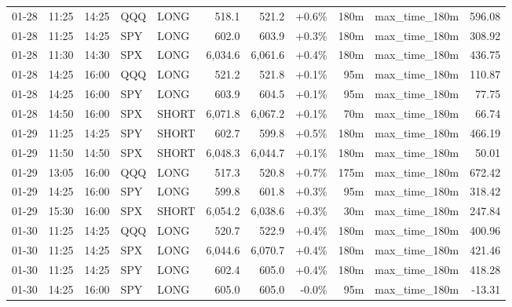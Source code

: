 \documentclass[11pt,a4paper,twoside]{article}
\begin{document}
\begin{center}
\begin{longtable}{>{\color{txtmain}}l l l l l r r r r >{\color{txtmain}}l r}
01-28 & 11:25 & 14:25 & QQQ & LONG & 518.1 & 521.2 & \textcolor{wingreen}{+0.6\%} & 180m & max\_time\_180m & \textcolor{wingreen}{596.08} \\
01-28 & 11:25 & 14:25 & SPY & LONG & 602.0 & 603.9 & \textcolor{wingreen}{+0.3\%} & 180m & max\_time\_180m & \textcolor{wingreen}{308.92} \\
01-28 & 11:30 & 14:30 & SPX & LONG & 6,034.6 & 6,061.6 & \textcolor{wingreen}{+0.4\%} & 180m & max\_time\_180m & \textcolor{wingreen}{436.75} \\
01-28 & 14:25 & 16:00 & QQQ & LONG & 521.2 & 521.8 & \textcolor{wingreen}{+0.1\%} & 95m & max\_time\_180m & \textcolor{wingreen}{110.87} \\
01-28 & 14:25 & 16:00 & SPY & LONG & 603.9 & 604.5 & \textcolor{wingreen}{+0.1\%} & 95m & max\_time\_180m & \textcolor{wingreen}{77.75} \\
01-28 & 14:50 & 16:00 & SPX & SHORT & 6,071.8 & 6,067.2 & \textcolor{wingreen}{+0.1\%} & 70m & max\_time\_180m & \textcolor{wingreen}{66.74} \\
01-29 & 11:25 & 14:25 & SPY & SHORT & 602.7 & 599.8 & \textcolor{wingreen}{+0.5\%} & 180m & max\_time\_180m & \textcolor{wingreen}{466.19} \\
01-29 & 11:50 & 14:50 & SPX & SHORT & 6,048.3 & 6,044.7 & \textcolor{wingreen}{+0.1\%} & 180m & max\_time\_180m & \textcolor{wingreen}{50.01} \\
01-29 & 13:05 & 16:00 & QQQ & LONG & 517.3 & 520.8 & \textcolor{wingreen}{+0.7\%} & 175m & max\_time\_180m & \textcolor{wingreen}{672.42} \\
01-29 & 14:25 & 16:00 & SPY & LONG & 599.8 & 601.8 & \textcolor{wingreen}{+0.3\%} & 95m & max\_time\_180m & \textcolor{wingreen}{318.42} \\
01-29 & 15:30 & 16:00 & SPX & SHORT & 6,054.2 & 6,038.6 & \textcolor{wingreen}{+0.3\%} & 30m & max\_time\_180m & \textcolor{wingreen}{247.84} \\
01-30 & 11:25 & 14:25 & QQQ & LONG & 520.7 & 522.9 & \textcolor{wingreen}{+0.4\%} & 180m & max\_time\_180m & \textcolor{wingreen}{400.96} \\
01-30 & 11:25 & 14:25 & SPX & LONG & 6,044.6 & 6,070.7 & \textcolor{wingreen}{+0.4\%} & 180m & max\_time\_180m & \textcolor{wingreen}{421.46} \\
01-30 & 11:25 & 14:25 & SPY & LONG & 602.4 & 605.0 & \textcolor{wingreen}{+0.4\%} & 180m & max\_time\_180m & \textcolor{wingreen}{418.28} \\
01-30 & 14:25 & 16:00 & SPY & LONG & 605.0 & 605.0 & \textcolor{lossred}{-0.0\%} & 95m & max\_time\_180m & \textcolor{lossred}{-13.31} \\

\end{longtable}
\end{center}
\end{document}

